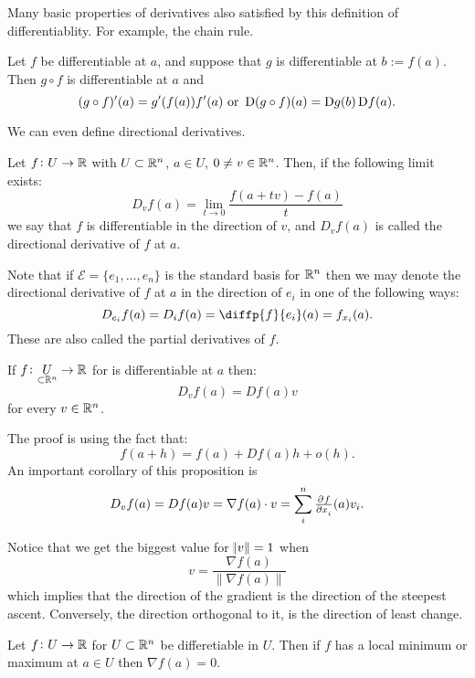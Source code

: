 \documentclass[11pt,a4paper]{article}
\begin{document}
Many basic properties of derivatives also satisfied by this
definition of differentiablity.
For example, the chain rule.
\begin{proposition}
  Let $f$ be differentiable at $a$, and suppose that $g$ is differentiable
  at $b := f(a)$. Then $g \circ f$ is differentiable at $a$ and
  \[
    (g \circ f)'(a) = g'(f(a)) f'(a) \stor
    \Dif\, (g \circ f)(a) = \Dif g(b) \Dif f(a).
  \]
\end{proposition}
We can even define directional derivatives.
\begin{definition}
  Let $f \colon U \to \mathbb{R}$ with $U \subset \mathbb{R}^n$, $a \in U$, $0 \neq v
  \in \mathbb{R}^n$. Then, if the following limit exists:
  \[
    D_v f(a) = \lim_{t \to 0}{\frac{f(a + tv) - f(a)}{t}}
  \]
  we say that $f$ is differentiable in the direction of $v$, and
  $D_v f(a)$ is called the directional derivative of $f$ at $a$.
\end{definition}

\begin{remark}
  Note that if $\mathcal{E} = \{e_1,\dots,e_n\}$ is the standard basis
  for $\mathbb{R}^n$ then we may denote the directional derivative of $f$ at $a$
  in the direction of $e_i$ in one of the following ways:
  \[
    D_{e_i} f(a) = D_i f(a) = \diffp{f}{{e_i}}(a) = 
    f_{x_i}(a).
  \]
  These are also called the partial derivatives of $f$.
\end{remark}

\begin{proposition}
  If $f \colon \underset{\subset \mathbb{R}^n}{U} \to \mathbb{R}$ for is differentiable 
  at $a$ then:
    \[
      D_v f(a) = D f(a) v
    \]	
  for every $v \in \mathbb{R}^n$.
\end{proposition} 
The proof is using the fact that:
\[
  f(a+h) = f(a) + Df(a)h + o(h).
\]
An important corollary of this proposition is
\[
  D_vf(a) = D f(a) v = \nabla f(a) \cdot v = 
  \sum_{i}^{n} \pd{f}{x_i}(a)v_i.
\]

\begin{remark}
  Notice that we get the biggest value for $\norm{v} = 1$ when
  \[
    v = \frac{\nabla f(a)}{\|\nabla f(a)\|}
  \]
  which implies that the direction
  of the gradient is the direction of the steepest ascent. Conversely,
  the direction orthogonal to it, is the direction of least change.
\end{remark}

\begin{proposition}
  Let $f \colon U \to \mathbb{R}$ for $U \subset \mathbb{R}^n$ be differetiable in $U$.
  Then if $f$ has a local minimum or maximum at $a \in U$ then
  $\nabla f(a) = 0$.
\end{proposition}
\end{document}
